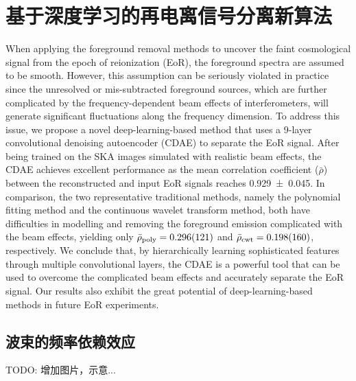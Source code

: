 
\chapter{基于深度学习的再电离信号分离新算法}
\label{chap:cdae}

When applying the foreground removal methods to uncover the
faint cosmological signal from the epoch of reionization (EoR),
the foreground spectra are assumed to be smooth.
However, this assumption can be seriously violated in practice since
the unresolved or mis-subtracted foreground sources, which are further
complicated by the frequency-dependent beam effects of interferometers,
will generate significant fluctuations along the frequency dimension.
To address this issue, we propose a novel deep-learning-based method
that uses a 9-layer convolutional denoising autoencoder (CDAE) to
separate the EoR signal.
After being trained on the SKA images simulated with realistic beam
effects, the CDAE achieves excellent performance as the mean correlation
coefficient ($\bar{\rho}$) between the reconstructed and input EoR
signals reaches \num{0.929 +- 0.045}.
In comparison,
the two representative traditional methods, namely the polynomial
fitting method and the continuous wavelet transform method, both have
difficulties in modelling and removing the foreground emission
complicated with the beam effects,
yielding only
$\bar{\rho}_{\mathrm{poly}} = \num{0.296 +- 0.121}$ and
$\bar{\rho}_{\mathrm{cwt}} = \num{0.198 +- 0.160}$, respectively.
We conclude that, by hierarchically learning sophisticated features
through multiple convolutional layers, the CDAE is a powerful tool that
can be used to overcome the complicated beam effects and accurately
separate the EoR signal.
Our results also exhibit the great
potential of deep-learning-based methods in future EoR experiments.


\section{波束的频率依赖效应}
\label{sec:beam-effect}

TODO: 增加图片，示意...

